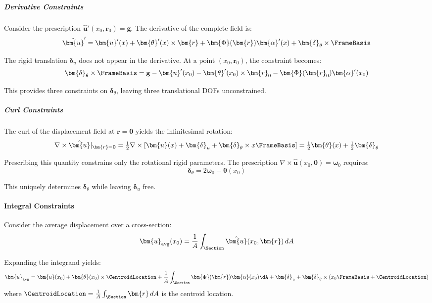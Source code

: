 \subparagraph{Derivative Constraints}

Consider the prescription $\hat{\bm{u}}'(x_0, \bm{r}_0) = \mathbf{g}$. The derivative of the complete field is:
\begin{equation}
\hat{\bm{u}}' = \bm{u}'(x) + \bm{\theta}'(x) \times \bm{r} + \bm{\Phi}(\bm{r}) \bm{\alpha}'(x) + \bm{\delta}_\theta \times \FrameBasis
\end{equation}

The rigid translation $\bm{\delta}_u$ does not appear in the derivative. 
At a point $(x_0, \bm{r}_0)$, the constraint becomes:
\begin{equation}
\bm{\delta}_\theta \times \FrameBasis = \mathbf{g} - \bm{u}'(x_0) - \bm{\theta}'(x_0) \times \bm{r}_0 - \bm{\Phi}(\bm{r}_0) \bm{\alpha}'(x_0)
\end{equation}

This provides three constraints on $\bm{\delta}_\theta$, leaving three translational DOFs unconstrained.

\subparagraph{Curl Constraints}

The curl of the displacement field at $\bm{r} = \mathbf{0}$ yields the infinitesimal rotation:
\begin{equation}
\nabla \times \hat{\bm{u}}|_{\bm{r}=\mathbf{0}} = \tfrac{1}{2}\nabla \times [\bm{u}(x) + \bm{\delta}_u + \bm{\delta}_\theta \times x\FrameBasis] = \tfrac{1}{2}\bm{\theta}(x) + \tfrac{1}{2}\bm{\delta}_\theta
\end{equation}

Prescribing this quantity constrains only the rotational rigid parameters. The prescription $\nabla \times \hat{\bm{u}}(x_0,\mathbf{0}) = \bm{\omega}_0$ requires:
\begin{equation}
\bm{\delta}_\theta = 2\bm{\omega}_0 - \bm{\theta}(x_0)
\end{equation}

This uniquely determines $\bm{\delta}_\theta$ while leaving $\bm{\delta}_u$ free.

\paragraph{Integral Constraints}

Consider the average displacement over a cross-section:
\begin{equation}
\bm{u}_{\text{avg}}(x_0) = \frac{1}{A}\int_{\Section} \hat{\bm{u}}(x_0, \bm{r}) \, dA
\end{equation}

Expanding the integrand yields:
\begin{equation}
\bm{u}_{\text{avg}} = \bm{u}(x_0) + \bm{\theta}(x_0) \times \CentroidLocation + \frac{1}{A}\int_{\Section} \bm{\Phi}(\bm{r}) \bm{\alpha}(x_0) \dA 
+ \bm{\delta}_u + \bm{\delta}_\theta \times (x_0\FrameBasis + \CentroidLocation)
\end{equation}
where $\CentroidLocation = \frac{1}{A}\int_{\Section} \bm{r} \, dA$ is the centroid location.

